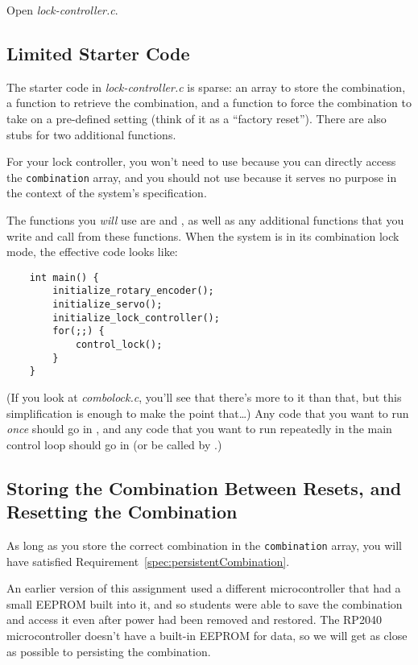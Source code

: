 Open \textit{lock-controller.c}.

\subsection{Limited Starter Code}

The starter code in \textit{lock-controller.c} is sparse:
an array to store the combination, a function to retrieve the combination, and a function to force the combination to take on a pre-defined setting (think of it as a ``factory reset'').
There are also stubs for two additional functions.

For your lock controller, you won't need to use  because you can directly access the \lstinline{combination} array,
and you should not use  because it serves no purpose in the context of the system's specification.

The functions you \textit{will} use are  and , as well as any additional functions that you write and call from these functions.
When the system is in its combination lock mode, the effective  code looks like:
\begin{lstlisting}
    int main() {
        initialize_rotary_encoder();
        initialize_servo();
        initialize_lock_controller();
        for(;;) {
            control_lock();
        }
    }
\end{lstlisting}
(If you look at \textit{combolock.c}, you'll see that there's more to it than that, but this simplification is enough to make the point that\dots)
Any code that you want to run \textit{once} should go in , and any code that you want to run repeatedly in the main control loop should go in  (or be called by .)


\subsection{Storing the Combination Between Resets, and Resetting the Combination}

As long as you store the correct combination in the \lstinline{combination} array, you will have satisfied Requirement~\ref{spec:persistentCombination}.

An earlier version of this assignment used a different microcontroller that had a small EEPROM built into it, and so students were able to save the combination and access it even after power had been removed and restored.
The RP2040 microcontroller doesn't have a built-in EEPROM for data, so we will get as close as possible to persisting the combination.

